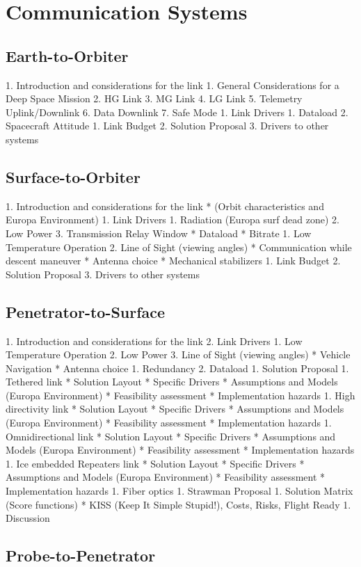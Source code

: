 \section{Communication Systems}

\subsection{Earth-to-Orbiter}

1. Introduction and considerations for the link
   1. General Considerations for a Deep Space Mission
   2. HG Link
   3. MG Link
   4. LG Link
   5. Telemetry Uplink/Downlink
   6. Data Downlink
   7. Safe Mode
1. Link Drivers
   1. Dataload
   2. Spacecraft Attitude
1. Link Budget
2. Solution Proposal
3. Drivers to other systems

\subsection{Surface-to-Orbiter}

1. Introduction and considerations for the link
      * (Orbit characteristics and Europa Environment)
1. Link Drivers
   1. Radiation (Europa surf dead zone)
   2. Low Power
   3. Transmission Relay Window
      * Dataload
      * Bitrate
   1. Low Temperature Operation
   2. Line of Sight (viewing angles)
      * Communication while descent maneuver
      * Antenna choice
      * Mechanical stabilizers
1. Link Budget
2. Solution Proposal
3. Drivers to other systems

\subsection{Penetrator-to-Surface}

1. Introduction and considerations for the link
2. Link Drivers
   1. Low Temperature Operation
   2. Low Power
   3. Line of Sight (viewing angles)
      * Vehicle Navigation
      * Antenna choice
   1. Redundancy
   2. Dataload
1. Solution Proposal
   1. Tethered link
      * Solution Layout
         * Specific Drivers
      * Assumptions and Models (Europa Environment)
      * Feasibility assessment
      * Implementation hazards
   1. High directivity link
      * Solution Layout
         * Specific Drivers
      * Assumptions and Models (Europa Environment)
      * Feasibility assessment
      * Implementation hazards
   1. Omnidirectional link
      * Solution Layout
         * Specific Drivers
      * Assumptions and Models (Europa Environment)
      * Feasibility assessment
      * Implementation hazards
   1. Ice embedded Repeaters link
      * Solution Layout
         * Specific Drivers
      * Assumptions and Models (Europa Environment)
      * Feasibility assessment
      * Implementation hazards
    1. Fiber optics
1. Strawman Proposal
   1. Solution Matrix (Score functions)
      * KISS (Keep It Simple Stupid!), Costs, Risks, Flight Ready
   1. Discussion

\subsection{Probe-to-Penetrator}